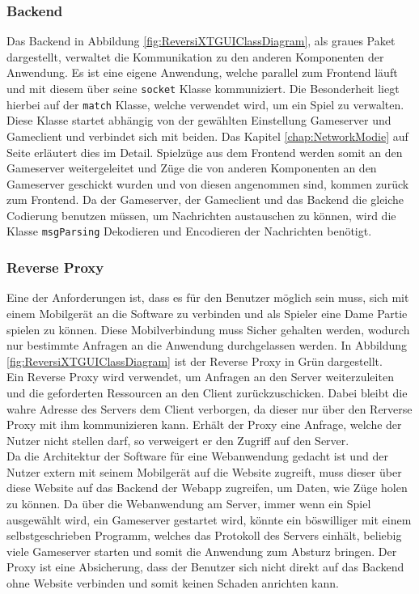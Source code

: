 \documentclass[12pt,a4paper,bibliography=totocnumbered,listof=totocnumbered]{article}
\begin{document}
\subsubsection{Backend}
Das Backend in Abbildung \ref{fig:ReversiXTGUIClassDiagram}, als graues Paket dargestellt, verwaltet die Kommunikation zu den anderen Komponenten der Anwendung.
Es ist eine eigene Anwendung, welche parallel zum Frontend läuft und mit diesem über seine \texttt{socket} Klasse kommuniziert.
Die Besonderheit liegt hierbei auf der \texttt{match} Klasse, welche verwendet wird, um ein Spiel zu verwalten. 
Diese Klasse startet abhängig von der gewählten Einstellung Gameserver und Gameclient und verbindet sich mit beiden. Das Kapitel \ref{chap:NetworkModie} auf 
Seite \pageref{chap:NetworkModie} erläutert dies im Detail. Spielzüge aus dem Frontend werden somit 
an den Gameserver weitergeleitet und Züge die von anderen Komponenten an den Gameserver geschickt wurden und von diesen angenommen sind, kommen zurück zum Frontend.
Da der Gameserver, der Gameclient und das Backend die gleiche Codierung benutzen müssen, um Nachrichten austauschen zu können, wird 
die Klasse \texttt{msgParsing} Dekodieren und Encodieren der Nachrichten benötigt.

\subsubsection{Reverse Proxy}
Eine der Anforderungen ist, dass es für den Benutzer möglich sein muss, sich mit einem Mobilgerät an die Software zu verbinden und als Spieler eine
Dame Partie spielen zu können. Diese Mobilverbindung muss Sicher gehalten werden, wodurch nur bestimmte Anfragen an die Anwendung durchgelassen werden.
In Abbildung \ref{fig:ReversiXTGUIClassDiagram} ist der Reverse Proxy in Grün dargestellt.
\\ 
Ein Reverse Proxy wird verwendet, um Anfragen an den Server weiterzuleiten und die geforderten Ressourcen an den Client zurückzuschicken. Dabei 
bleibt die wahre Adresse des Servers dem Client verborgen, da dieser nur über den Rerverse Proxy mit ihm kommunizieren kann.
Erhält der Proxy eine Anfrage, welche der Nutzer nicht stellen darf, so verweigert er den Zugriff auf den Server.
\\
Da die Architektur der Software für eine Webanwendung gedacht ist und der Nutzer extern mit seinem Mobilgerät auf die Website zugreift, 
muss dieser über diese Website auf das Backend der Webapp zugreifen, um Daten, wie Züge holen zu können.
Da über die Webanwendung am Server, immer wenn ein Spiel ausgewählt wird, ein Gameserver gestartet wird, könnte ein böswilliger
mit einem selbstgeschrieben Programm, welches das Protokoll des Servers einhält, beliebig viele Gameserver starten und somit die 
Anwendung zum Absturz bringen.
Der Proxy ist eine Absicherung, dass der Benutzer sich nicht direkt auf das Backend ohne Website verbinden und somit 
keinen Schaden anrichten kann. 
\end{document}
